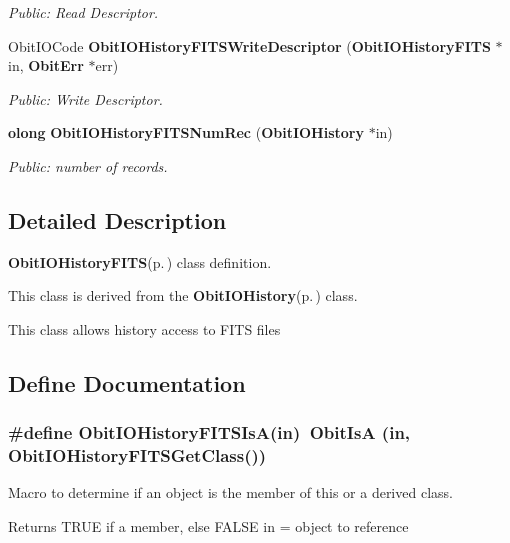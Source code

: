 \begin{CompactItemize}
\begin{CompactList}\small\item\em Public: Read Descriptor. \item\end{CompactList}\item 
Obit\-IOCode {\bf Obit\-IOHistory\-FITSWrite\-Descriptor} ({\bf Obit\-IOHistory\-FITS} $\ast$in, {\bf Obit\-Err} $\ast$err)
\begin{CompactList}\small\item\em Public: Write Descriptor. \item\end{CompactList}\item 
{\bf olong} {\bf Obit\-IOHistory\-FITSNum\-Rec} ({\bf Obit\-IOHistory} $\ast$in)
\begin{CompactList}\small\item\em Public: number of records. \item\end{CompactList}\end{CompactItemize}


\subsection{Detailed Description}
{\bf Obit\-IOHistory\-FITS}{\rm (p.\,\pageref{structObitIOHistoryFITS})} class definition. 

This class is derived from the {\bf Obit\-IOHistory}{\rm (p.\,\pageref{structObitIOHistory})} class.

This class allows history access to FITS files

\subsection{Define Documentation}
\subsubsection{\setlength{\rightskip}{0pt plus 5cm}\#define Obit\-IOHistory\-FITSIs\-A(in)\ Obit\-Is\-A (in, Obit\-IOHistory\-FITSGet\-Class())}\label{ObitIOHistoryFITS_8h_a2}


Macro to determine if an object is the member of this or a derived class. 

Returns TRUE if a member, else FALSE in = object to reference 
